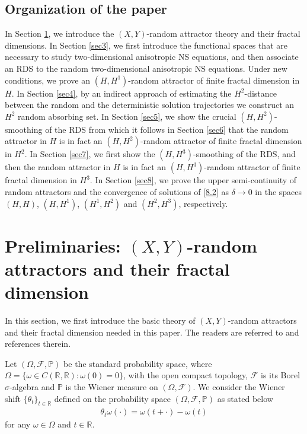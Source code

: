 \documentclass{elsarticle}
\theoremstyle{definition}
\numberwithin{equation}{section}
\begin{document}
\subsection*{Organization of the paper}

In Section \ref{sec2}, we introduce the  $(X,Y)$-random attractor theory and their fractal dimensions.  In Section \ref{sec3}, we first  introduce the  functional spaces that are necessary to study two-dimensional anisotropic  NS equations, and then associate an RDS to the random two-dimensional anisotropic  NS equations. Under  new   conditions, we prove an $(H,H^1)$-random attractor of finite  fractal dimension in $H$.    In Section \ref{sec4}, by an indirect approach of  estimating the $H^2$-distance between the random and the deterministic solution trajectories  we construct an  $H^2$ random absorbing set. In Section \ref{sec5}, we  show the crucial  $(H,H^2)$-smoothing  of the RDS from which it follows in Section \ref{sec6}  that the random attractor    in $H$ is in fact an $(H,H^2)$-random attractor of finite  fractal dimension in $H^2$.  In Section \ref{sec7}, we  first show the   $(H,H^3)$-smoothing  of the RDS,  and then the random attractor    in $H$ is in fact an $(H,H^3)$-random attractor of finite  fractal dimension in $H^3$. In Section \ref{sec8}, we prove the  upper semi-continuity of random attractors  and the convergence of solutions of \eqref{8.2}  as $\delta\rightarrow0$ in the spaces $(H,H)$, $(H,H^1)$, $(H^1,H^2)$ and $(H^2,H^3)$, respectively.


\section{Preliminaries:   $(X,Y)$-random attractors and  their fractal dimension}\label{sec2}

In this section, we first introduce the basic  theory of $(X,Y)$-random attractors and their fractal dimension needed in this paper.   The readers are referred to \cite{arnold,crauel,cui18jdde,gu2020,gu2019,langa2} and references therein.

Let $(\Omega,\mathcal{F},\mathbb{P})$ be the standard probability space, where $\Omega=\{\omega\in C(\mathbb{R},\mathbb{R}):\omega(0)=0\}$, with the open compact topology, $\mathcal{F}$ is  its Borel $\sigma$-algebra and $\mathbb{P}$ is  the Wiener measure on $(\Omega,\mathcal{F})$.  We consider  the Wiener shift $\{\theta_t\}_{t\in\mathbb{R}}$ defined on the probability space $(\Omega,\mathcal{F},\mathbb{P})$ as  stated below
\begin{align*}
\theta_t\omega(\cdot)=\omega(t+\cdot)-\omega(t)
\end{align*}
for any $\omega\in\Omega$ and $t\in\mathbb{R}$.
\end{document}
